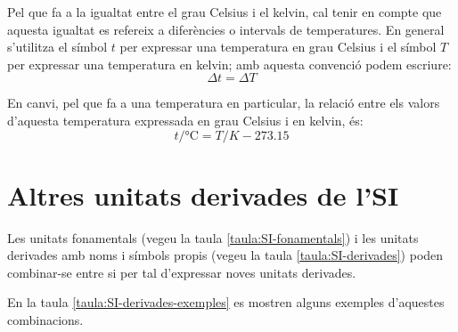 Pel que fa a la igualtat entre el grau Celsius i el kelvin, cal tenir en compte que aquesta igualtat es refereix a diferències o intervals de temperatures. En general s'utilitza el símbol $t$ per expressar una temperatura en grau Celsius i el símbol $T$ per expressar una temperatura en kelvin; amb aquesta convenció podem escriure:
\begin{equation}
	\Delta t = \Delta T
\end{equation}

En canvi, pel que fa a una temperatura en particular, la relació entre els valors d'aquesta temperatura expressada en grau Celsius i en kelvin, és:
\begin{equation}
	t / \unit{\degreeCelsius} = T / \unit{K} - \num{273,15}
\end{equation}


\section{Altres unitats derivades de l'SI}

Les unitats fonamentals (vegeu la taula \vref{taula:SI-fonamentals}) i les unitats derivades amb noms i símbols propis (vegeu la taula \vref{taula:SI-derivades}) poden combinar-se entre si per tal d'expressar noves unitats derivades.

 En la taula \vref{taula:SI-derivades-exemples} es mostren alguns exemples d'aquestes combinacions.

